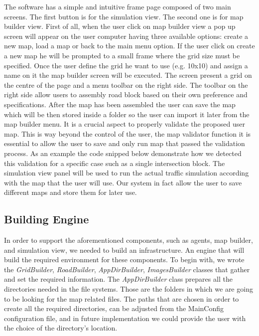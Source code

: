 \documentclass[oneside]{article}
\begin{document}
\noindent The software has a simple and intuitive frame page composed of two main screens. The first button is for the simulation view. The second one is for map builder view. First of all, when the user click on map builder view a pop up screen will appear on the user computer having three available options: create a new map, load a map or back to the main menu option. If the user click on create a new map he will be prompted to a small frame where the grid size must be specified. Once the user define the grid he want to use (e.g. 10x10) and assign a name on it the map builder screen will be executed. The screen present a grid on the centre of the page and a menu toolbar on the right side. The toolbar on the right side allow users to assembly road block based on their own preference and specifications. After the map has been assembled the user can save the map which will be then stored inside a folder so the user can import it later from the map builder menu. It is a crucial aspect to properly validate the proposed user map. This is way beyond the control of the user, the map validator function it is essential to allow the user to save and only run map that passed the validation process. As an example the code snipped below demonstrate how we detected this validation for a specific case such as a single intersection block. The simulation view panel will be used to run the actual traffic simulation according with the map that the user will use. Our system in fact allow the user to save different maps and store them for later use.

\subsection{Building Engine} 

In order to support the aforementioned components, such as agents, map builder, and simulation view, we needed to build an infrastructure. An engine that will build the required environment for these components. To begin with, we wrote the \textit{GridBuilder}, \textit{RoadBuilder}, \textit{AppDirBuilder}, \textit{ImagesBuilder} classes that gather and set the required information. The \textit{AppDirBuilder} class prepares all the directories needed in the file systems. Those are the folders in which we are going to be looking for the map related files. The paths that are chosen in order to create all the required directories, can be adjusted from the MainConfig configuration file, and in future implementation we could provide the user with the choice of the directory's location. \\
\end{document}

